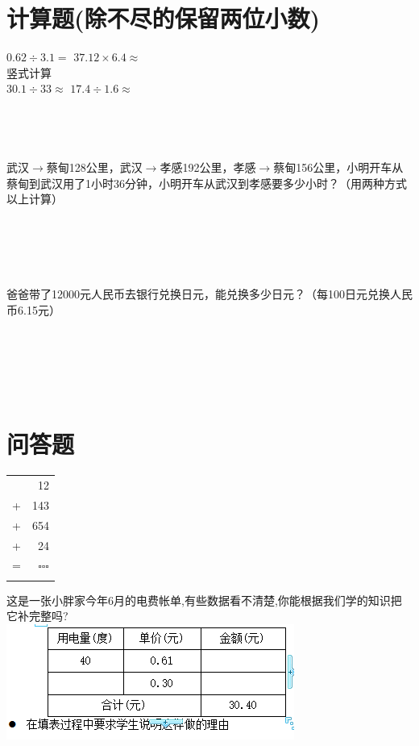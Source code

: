 \documentclass[UTF8,a4paper,11pt]{article}
\begin{document}
\begin{CJK}{UTF8}{gbsn}
\section{计算题(除不尽的保留两位小数)}
 $0.62\div3.1=$ \qquad\qquad $37.12\times6.4\approx $\\
竖式计算\\
$30.1\div 33\approx $ \qquad\qquad $17.4\div1.6\approx$
\\ \\ \\ \\ \\ 

武汉$\rightarrow$蔡甸128公里，武汉$\rightarrow$孝感192公里，孝感$\rightarrow$蔡甸156公里，小明开车从蔡甸到武汉用了1小时36分钟，小明开车从武汉到孝感要多少小时？（用两种方式以上计算）
\\ \\ \\ \\ \\ \\

爸爸带了12000元人民币去银行兑换日元，能兑换多少日元？（每100日元兑换人民币6.15元）
\\ \\ \\ \\ \\ \\

\section{问答题}
\begin{tabular}{lr}
&12\\
+&143\\
+&654\\
+&24\\
\hline
=&\small$\square\!\square\!\square$ \\ \\
\end{tabular}



这是一张小胖家今年6月的电费帐单,有些数据看不清楚,你能根据我们学的知识把它补完整吗? \\ 
\includegraphics{./pic/5-1-1.jpg}

\clearpage %
\end{CJK}
\end{document}
